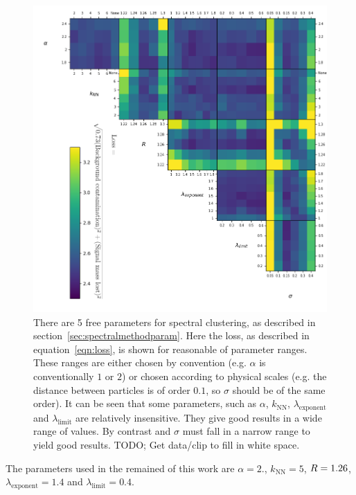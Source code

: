     \begin{figure}[htp]
            \includegraphics[width=1\textwidth]{graphics/trangle_scan_incomplete.png}
            \caption{There are 5 free parameters for spectral clustering,
                as described in section~\ref{sec:spectralmethodparam}.
                Here the loss, as described in equation~\ref{eqn:loss}, is shown for reasonable of parameter ranges.
                These ranges are either chosen by convention (e.g. \(\alpha\) is conventionally \(1\) or \(2\))
                or chosen according to physical scales (e.g. the distance between particles is of order \(0.1\),
                so \(\sigma\) should be of the same order).
                It can be seen that some parameters, such as \(\alpha\), \(k_\text{NN}\), \(\lambda_\text{exponent}\)
                and \(\lambda_\text{limit}\) are relatively insensitive.
                They give good results in a wide range of values.
                By contrast \stoppingdeltar{} and \(\sigma\) must fall in a narrow range to yield good results.
                {\color{red}TODO; Get data/clip to fill in white space.}
             }\label{fig:scan_spectral}
    \end{figure}    


    The parameters used in the remained of this work are \(\alpha=2.\), \(k_\text{NN}=5\), \(R{} = 1.26\), \(\lambda_\text{exponent} = 1.4\) and \(\lambda_\text{limit} = 0.4\).
